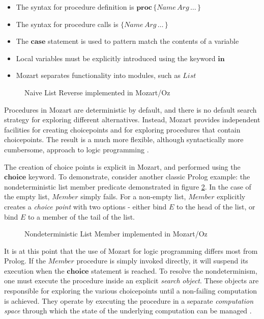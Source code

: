 \begin{itemize}
\item The syntax for procedure definition is $\mathbf{proc}\,\{Name\, Arg\,\dots\,\}$ 
\item The syntax for procedure calls is $\{Name\, Arg\,\dots\,\}$ 
\item The $\mathbf{case}$ statement is used to pattern match the contents
of a variable 
\item Local variables must be explicitly introduced using the keyword $\mathbf{in}$ 
\item Mozart separates functionality into modules, such as $List$ 
\end{itemize}
%
\begin{figure}[t]

\caption{Naive List Reverse implemented in Mozart/Oz\label{fig:Background:Naive-List-Reverse}}

\end{figure}


Procedures in Mozart are deterministic by default, and there is no
default search strategy for exploring different alternatives. Instead,
Mozart provides independent facilities for creating choicepoints and
for exploring procedures that contain choicepoints. The result is
a much more flexible, although syntactically more cumbersome, approach
to logic programming \citep{lpinoz99}.

The creation of choice points is explicit in Mozart, and performed
using the $\mathbf{choice}$ keyword. To demonstrate, consider another
classic Prolog example: the nondeterministic list member predicate
demonstrated in figure \ref{fig:Background:Nondet-Member}. In the
case of the empty list, $Member$ simply fails. For a non-empty list,
$Member$ explicitly creates a \emph{choice point} with two options
- either bind $E$ to the head of the list, or bind $E$ to a member
of the tail of the list.

%
\begin{figure}[t]

\caption{Nondeterministic List Member implemented in Mozart/Oz\label{fig:Background:Nondet-Member}}

\end{figure}


It is at this point that the use of Mozart for logic programming differs
most from Prolog. If the $Member$ procedure is simply invoked directly,
it will suspend its execution when the $\mathbf{choice}$ statement
is reached. To resolve the nondeterminism, one must execute the procedure
inside an explicit \emph{search} \emph{object}. These objects are
responsible for exploring the various choicepoints until a non-failing
computation is achieved. They operate by executing the procedure in
a separate \emph{computation space} through which the state of the
underlying computation can be managed \citep{schulte00constraint_services}.

